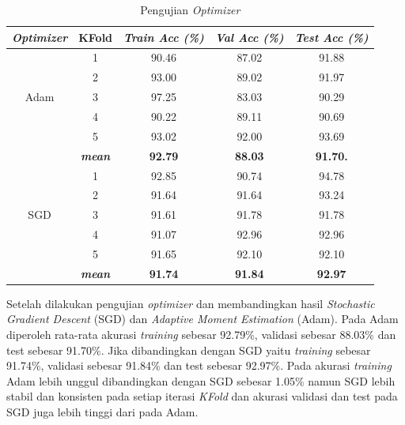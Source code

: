        \begin{table}[H]
        \centering
        \caption{Pengujian \textit{Optimizer}}
        \begin{tabular}{ccccc}
            \toprule
            \textbf{\textit{Optimizer}} & \multicolumn{1}{c}{\textbf{KFold}} & \textbf{\textit{Train Acc (\%) } } & \textbf{\textit{Val Acc (\%)}} & \textbf{\textit{Test Acc (\%)}}\\
        
            \midrule
            \multirow{5}{*}{Adam} 
            & 1 & 90.46 & 87.02 & 91.88 \\
            & 2 & 93.00 & 89.02 & 91.97 \\
            & 3 & 97.25 & 83.03 & 90.29 \\
            & 4 & 90.22 & 89.11 & 90.69 \\
            & 5 & 93.02 & 92.00 & 93.69 \\ 
            & \textit{\textbf{mean}}& \textbf{92.79} & \textbf{88.03} &\textbf{91.70.} \\ 
            \hline

    
            \multirow{5}{*}{SGD}
            & 1 & 92.85 & 90.74 & 94.78 \\
            & 2 & 91.64 & 91.64 & 93.24 \\
            & 3 & 91.61 & 91.78 & 91.78 \\
            & 4 & 91.07 & 92.96 & 92.96 \\
            & 5 & 91.65 & 92.10 & 92.10  \\
            & \textit{\textbf{mean}}& \textbf{91.74} & \textbf{91.84} &\textbf{92.97} \\ 
    

            \bottomrule
        \end{tabular}
        \label{Pengujian Optimizer}
    \end{table}


    Setelah dilakukan pengujian \textit{optimizer} dan membandingkan hasil \textit{Stochastic Gradient Descent} (SGD) dan \textit{Adaptive Moment Estimation} (Adam). Pada Adam diperoleh rata-rata akurasi \textit{training} sebesar 92.79\%, validasi sebesar 88.03\% dan test sebesar 91.70\%. Jika dibandingkan dengan SGD yaitu \textit{training} sebesar 91.74\%, validasi sebesar 91.84\% dan test sebesar 92.97\%. Pada akurasi \textit{training} Adam lebih unggul dibandingkan dengan SGD sebesar 1.05\% namun SGD lebih stabil dan konsisten pada setiap iterasi \textit{KFold} dan akurasi validasi dan test pada SGD juga lebih tinggi dari pada Adam.
    

